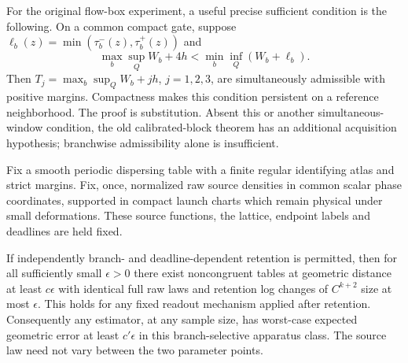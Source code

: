 For the original flow-box experiment, a useful precise sufficient
condition is the following.  On a common compact gate, suppose
$\ell_b(z)=\min(\tau_b^-(z),\tau_b^+(z))$ and
\begin{equation}\label{eq:v81-old-window}
 \max_b\sup_Q W_b+4h
             <\min_b\inf_Q(W_b+\ell_b).
\end{equation}
Then $T_j=\max_b\sup_QW_b+jh$, $j=1,2,3$, are simultaneously
admissible with positive margins.  Compactness makes this condition
persistent on a reference neighborhood.  The proof is substitution.
Absent this or another simultaneous-window condition, the old
calibrated-block theorem has an additional acquisition hypothesis;
branchwise admissibility alone is insufficient.

\begin{theorem}
\label{thm:v81-fixed-source}
Fix a smooth periodic dispersing table with a finite regular identifying
atlas and strict margins.  Fix, once, normalized raw source densities
in common scalar phase coordinates, supported in compact launch charts
which remain physical under small deformations.  These source functions,
the lattice, endpoint labels and deadlines are held fixed.

If independently branch- and deadline-dependent retention is permitted,
then for all sufficiently small $\epsilon>0$ there exist noncongruent
tables at geometric distance at least $c\epsilon$ with identical full
raw laws and retention log changes of $C^{k+2}$ size at most $\epsilon$.
This holds for any fixed readout mechanism applied after retention.
Consequently any estimator, at any sample size, has worst-case expected
geometric error at least $c'\epsilon$ in this branch-selective apparatus
class.  The source law need not vary between the two parameter points.
\end{theorem}
